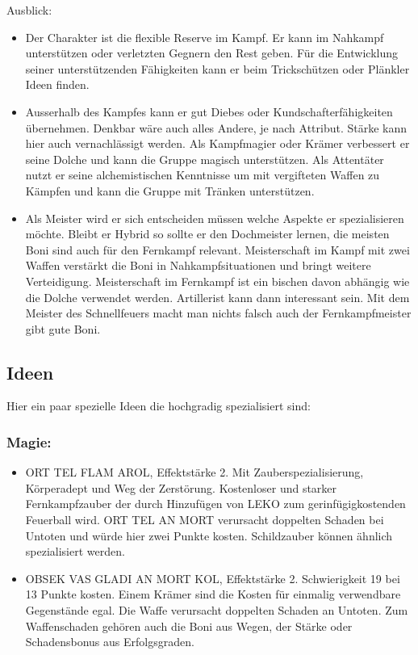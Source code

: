 \documentclass{article}
\begin{document}
Ausblick:
\begin{itemize}
\item Der Charakter ist die flexible Reserve im Kampf. Er kann im Nahkampf unterstützen oder verletzten Gegnern den Rest geben. Für die Entwicklung seiner unterstützenden Fähigkeiten kann er beim Trickschützen oder Plänkler Ideen finden.
\item Ausserhalb des Kampfes kann er gut Diebes oder Kundschafterfähigkeiten übernehmen. Denkbar wäre auch alles Andere, je nach Attribut. Stärke kann hier auch vernachlässigt werden. Als Kampfmagier oder Krämer verbessert er seine Dolche und kann die Gruppe magisch unterstützen. Als Attentäter nutzt er seine alchemistischen Kenntnisse um mit vergifteten Waffen zu Kämpfen und kann die Gruppe mit Tränken unterstützen.
\item Als Meister wird er sich entscheiden müssen welche Aspekte er spezialisieren möchte. Bleibt er Hybrid so sollte er den Dochmeister lernen, die meisten Boni sind auch für den Fernkampf relevant. Meisterschaft im Kampf mit zwei Waffen verstärkt die Boni in Nahkampfsituationen und bringt weitere Verteidigung. Meisterschaft im Fernkampf ist ein bischen davon abhängig wie die Dolche verwendet werden. Artillerist kann dann interessant sein. Mit dem Meister des Schnellfeuers macht man nichts falsch auch der Fernkampfmeister gibt gute Boni.
\end{itemize}

\begin{center}
\subsection{Ideen}
\end{center}
Hier ein paar spezielle Ideen die hochgradig spezialisiert sind:

\subsubsection{Magie:}
\begin{itemize}
\item ORT TEL FLAM AROL, Effektstärke 2. Mit Zauberspezialisierung, Körperadept und Weg der Zerstörung. Kostenloser und starker Fernkampfzauber der durch Hinzufügen von LEKO zum gerinfügigkostenden Feuerball wird. ORT TEL AN MORT verursacht doppelten Schaden bei Untoten und würde hier zwei Punkte kosten. Schildzauber können ähnlich spezialisiert werden.
\item OBSEK VAS GLADI AN MORT KOL, Effektstärke 2. Schwierigkeit 19 bei 13 Punkte kosten. Einem Krämer sind die Kosten für einmalig verwendbare Gegenstände egal. Die Waffe verursacht doppelten Schaden an Untoten. Zum Waffenschaden gehören auch die Boni aus Wegen, der Stärke oder Schadensbonus aus Erfolgsgraden.
\end{itemize}
\end{document}
